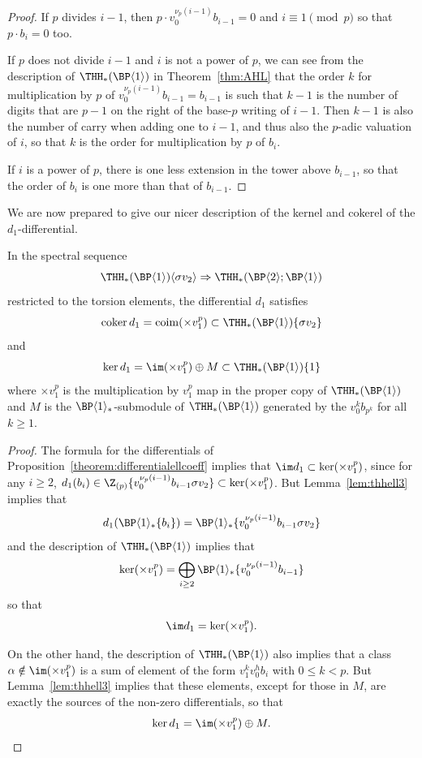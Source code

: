 \begin{proof}
  If $p$ divides $i - 1$, then $p \cdot v_0^{\nu_p(i-1)} b_{i-1} = 0$ and $i \equiv 1 \pmod{p}$ so that $p \cdot b_i = 0$ too.

  If $p$ does not divide $i-1$ and $i$ is not a power of $p$, we can see from the description of $\THH_*(\BP\langle 1\rangle)$ in Theorem~\ref{thm:AHL} that the order $k$ for multiplication by $p$ of $v_0^{\nu_p(i-1)} b_{i-1} = b_{i -1}$ is such that $k -1$ is the number of digits that are $p - 1$ on the right of the base-$p$ writing of $i - 1$. Then $k-1$ is also the number of carry when adding one to $i -1$, and thus also the $p$-adic valuation of $i$, so that $k$ is the order for multiplication by $p$ of $b_i$.

  If $i$ is a power of $p$, there is one less extension in the tower above $b_{i-1}$, so that the order of $b_i$ is one more than that of $b_{i-1}$.
\end{proof}
We are now prepared to give our nicer description of the kernel and cokerel of the $d_1$-differential. 
\begin{proposition} \label{prop:specseqtorsion}
  In the spectral sequence
  \[
    \THH_*(\BP\langle 1\rangle) \langle \sigma v_2 \rangle \Rightarrow \THH_*(\BP \langle 2 \rangle; \BP\langle 1\rangle)
  \]
  restricted to the torsion elements, the differential $d_1$ satisfies
  \[
    \operatorname{coker} d_1 = \operatorname{coim}(\times v_1^p) \subset \THH_*(\BP\langle 1\rangle)\{ \sigma v_2 \}
  \]
  and
  \[
    \ker d_1 =  \im (\times v_1^p) \oplus M \subset \THH_*(\BP\langle 1\rangle)\{ 1 \}
  \]
  where $\times v_1^p$ is the multiplication by $v_1^p$ map in the proper copy of $\THH_*(\BP\langle 1\rangle)$ and $M$ is the $\BP\langle 1\rangle_*$-submodule of $\THH_*(\BP\langle 1\rangle)$ generated by the $v_0^{k}b_{p^k}$ for all $k \geq 1$.
\end{proposition}

\begin{proof}
  The formula for the differentials of Proposition~\ref{theorem:differentialellcoeff} implies that $\im d_1 \subset \ker (\times v_1^p)$, since for any $i \geq 2$, $d_1(b_i) \in \Z_{(p)}\{ v_0^{\nu_p(i-1)} b_{i-1} \sigma v_2 \} \subset \ker (\times v_1^p)$. But Lemma~\ref{lem:thhell3} implies that
  \[
    d_1(\BP\langle 1\rangle_*\{ b_i \} ) = \BP\langle 1\rangle_* \{ v_0^{\nu_p(i-1)} b_{i-1} \sigma v_2 \}
  \]
  and the description of $\THH_*(\BP\langle 1\rangle)$ implies that
  \[
    \ker (\times v_1^p) = \bigoplus_{i \geq 2} \BP\langle 1\rangle_* \{ v_0^{\nu_p(i-1)} b_{i-1} \}
  \]
  so that
  \[
    \im d_1 = \ker (\times v_1^p).
  \]

  On the other hand, the description of $\THH_*(\BP\langle 1\rangle)$ also implies that a class $\alpha \notin \im (\times v_1^p)$ is a sum of element of the form $v_1^k v_0^h b_i$ with $0 \leq k < p$. 
  But Lemma~\ref{lem:thhell3} implies that these elements, except for those in $M$, are exactly the sources of the non-zero differentials, so that
  \[
    \ker d_1 = \im (\times v_1^p) \oplus M.
  \]
\end{proof}

